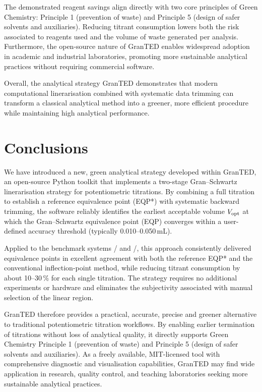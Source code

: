 \documentclass[twoside,twocolumn,9pt]{article}
\begin{document}
The demonstrated reagent savings align directly with two core principles of Green Chemistry: Principle 1 (prevention of waste) and Principle 5 (design of safer solvents and auxiliaries).
Reducing titrant consumption lowers both the risk associated to reagents used and the volume of waste generated per analysis.
Furthermore, the open-source nature of \textsf{GranTED} enables widespread adoption in academic and industrial laboratories, promoting more sustainable analytical practices without requiring commercial software.

Overall, the analytical strategy \textsf{GranTED} demonstrates that modern computational linerarisation combined with systematic data trimming can transform a classical analytical method into a greener, more efficient procedure while maintaining high analytical performance.

\section*{Conclusions}

We have introduced a new, green analytical strategy developed within \textsf{GranTED}, an open-source Python toolkit that implements a two-stage Gran--Schwartz linerarisation strategy for potentiometric titrations.
By combining a full titration to establish a reference equivalence point (EQP*) with systematic backward trimming, the software reliably identifies the earliest acceptable volume \(V_{\rm opt}\) at which the Gran--Schwartz equivalence point (EQP) converges within a user-defined accuracy threshold (typically 0.010--0.050\,mL). 

Applied to the benchmark systems / and /, this approach consistently delivered equivalence points in excellent agreement with both the reference EQP* and the conventional inflection-point method, while reducing titrant consumption by about 10--30\,\% for each single titration.
The strategy requires no additional experiments or hardware and eliminates the subjectivity associated with manual selection of the linear region.

\textsf{GranTED} therefore provides a practical, accurate, precise and greener alternative to traditional potentiometric titration workflows.
By enabling earlier termination of titrations without loss of analytical quality, it directly supports Green Chemistry Principle 1 (prevention of waste) and Principle 5 (design of safer solvents and auxiliaries).
As a freely available, MIT-licensed tool with comprehensive diagnostic and visualisation capabilities, \textsf{GranTED} may find wide application in research, quality control, and teaching laboratories seeking more sustainable analytical practices.
\end{document}
